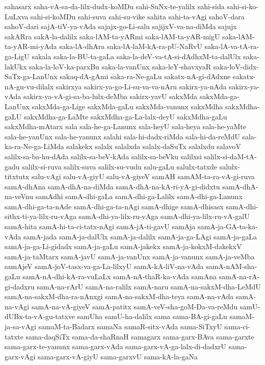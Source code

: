 {sahasarx
saha-vA-sa-da-lilx-dudx-koMDu
sahi-SuNx-te-yalilx
sahi-sida
sahi-si-ko-LuLxva
sahi-si-koMDu
sahi-suva
sahi-su-vike
sahita
sahi-ta-vAgi
sahoV-dara
sahoV-dari
sajA-tiV-ya-vAda
sajajx-go-Li-salu
sajijxV-va-na-diMda
sajujx
sakARra
sakA-la-dalilx
saka-lAM-ta-yARmi
saka-lAM-ta-yAR-migU
saka-lAM-ta-yAR-mi-yAda
saka-lA-dhAra
saka-lA-laM-kA-ra-pU-NaRvU
saka-lA-va-tA-ra-ga-LigU
sakala
saka-la-BU-ta-gaLa
saka-la-deV-va-tA-si-dAdhxM-ta-dalUlx
saka-lakUkx
saka-la-loV-ka-parxBu
saka-la-vanUnx
saka-leY-shavxyaR
saka-loV-didx-SaTx-ga-LanUnx
sakaq-dA-gAmi
saka-ra-Ne-gaLu
sakatx-nA-gi-dAdxne
sakatx-nA-gu-vu-dilalx
sakirxya
sakirx-ya-go-Li-su-va-va-nAru
sakirx-ya-nAda
sakirx-ya-vAda
sakirx-ya-vA-gi-sa-ba-lulx-deMba
sakirx-yavU
sakxMda
sakxMda-ga-LanUnx
sakxMda-ga-Lige
sakxMda-gaLu
sakxMda-vanunx
sakxMdha
sakxMdha-gaLU
sakxMdha-ga-LaMte
sakxMdha-ga-La-lalx-deyU
sakxMdha-gaLu
sakxMdha-mAtarx
sala
sala-he-ga-Lanunx
sala-heyU
sala-heya
sala-he-yaMte
sala-he-yanUnx
sala-he-yanunx
salahi
sala-hi-dadx-riMda
sala-hi-da-reMdU
sala-ka-ra-Ne-ga-LiMda
salakekx
salalx
salalxda
salalx-daSuTx
salalxdu
salavoV
salilx-sa-ba-hu-dAda
salilx-sa-beV-kAda
salilx-sa-beVku
salilxsi
salilx-si-daM-tA-gadu
salilx-si-ruva
salilx-suva
salilx-su-vudu
salu-gaLu
salulx-tatxde
salulx-titxtutx
salu-vAgi
salu-vA-giyU
salu-vA-giyeV
samAH
samAM-ta-ra-vA-gi-ruva
samA-dhAna
samA-dhA-na-diMda
samA-dhA-na-kA-ri-yA-gi-didxtu
samA-dhA-na-veVnu
samAdhi
samA-dhi-gaLa
samA-dhi-ga-Lalilx
samA-dhi-ga-Lanunx
samA-dhi-ga-ta-nAde
samA-dhi-ga-ta-nAgi
samA-dhige
samA-dhisasx
samA-dhi-sithx-ti-ya-lilx-ru-vAga
samA-dhi-ya-lilx-ru-vAga
samA-dhi-ya-lilx-ru-vA-galU
samA-hita
samA-hi-ta-ci-tatx-nAgi
samA-jA-ti-gavU
samAja
samA-ja-GA-ta-ka-vAda
samA-jada
samA-ja-dalUlx
samA-ja-dalilx
samA-ja-ga-LAgi
samA-ja-gaLa
samA-ja-ga-Li-gidadx
samA-ja-gaLu
samA-jakekx
samA-ja-kokxM-dakekxV
samA-ja-taMtarx
samA-javU
samA-ja-vanUnx
samA-ja-vanunx
samA-ja-veMba
samAjeV
samA-joV-tasx-va-ga-La-lilxyU
samA-kA-liV-na-vAda
samA-nAM-sha-gaLu
samA-nA-dhi-kA-ra-vuLaLx
samA-nA-thaR-ka-vAda
samAna
samA-na-rA-gi-dadxru
samA-na-rArU
samA-na-ralilx
samA-naru
samA-na-sakxM-dha-LeMdU
samA-na-sakxM-dha-ra-nAnxgi
samA-na-sakxM-dha-teya
samA-na-vAda
samA-na-vAgi
samA-na-vA-giyeV
samA-patitx
samA-veV-sha-goM-Da-va-reMdu
samU-dUBx-ta-vA-gu-tatxve
samUha
samU-ha-dalilx
sama
sama-BA-gi-gaLu
samaM-ja-sa-vAgi
samaM-ta-Badarx
samaNa
samaR-sitx-vAda
sama-SiTxyU
sama-ci-tatxte
sama-daqSiTx
sama-da-shaRnaH
samagarx
sama-garx-BAva
sama-garxte
sama-garx-te-yanunx
sama-garx-vAda
sama-garx-vA-ga-lalx-di-dadxrU
sama-garx-vAgi
sama-garx-vA-giyU
sama-garxvU
sama-kA-la-gaNa
}
